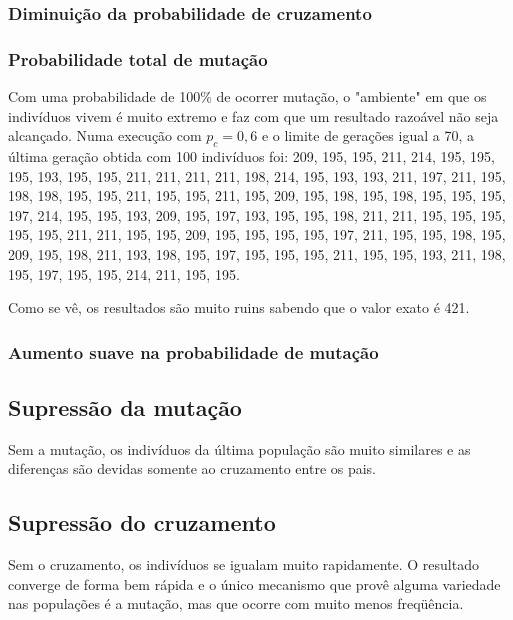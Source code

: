 \documentclass[11pt]{article}
\begin{document}
\subsubsection{Diminuição da probabilidade de cruzamento}

\subsubsection{Probabilidade total de mutação}

Com uma probabilidade de 100\% de ocorrer mutação, o "ambiente" em que os indivíduos vivem é muito extremo e faz com que um resultado razoável não seja alcançado. Numa execução com $p_c = 0,6$ e o limite de gerações igual a 70, a última geração obtida com 100 indivíduos foi: 209, 195, 195, 211, 214, 195, 195, 195, 193, 195, 195, 211, 211, 211, 211, 198, 214, 195, 193, 193, 211, 197, 211, 195, 198, 198, 195, 195, 211, 195, 195, 211, 195, 209, 195, 198, 195, 198, 195, 195, 195, 197, 214, 195, 195, 193, 209, 195, 197, 193, 195, 195, 198, 211, 211, 195, 195, 195, 195, 195, 211, 211, 195, 195, 209, 195, 195, 195, 195, 197, 211, 195, 195, 198, 195, 209, 195, 198, 211, 193, 198, 195, 197, 195, 195, 195, 211, 195, 195, 193, 211, 198, 195, 197, 195, 195, 214, 211, 195, 195.

Como se vê, os resultados são muito ruins sabendo que o valor exato é 421.

\subsubsection{Aumento suave na probabilidade de mutação}

\subsection{Supressão da mutação}

Sem a mutação, os indivíduos da última população são muito similares e as diferenças são devidas somente ao cruzamento entre os pais.

\subsection{Supressão do cruzamento} 

Sem o cruzamento, os indivíduos se igualam muito rapidamente. O resultado converge de forma bem rápida e o único mecanismo que provê alguma variedade nas populações é a mutação, mas que ocorre com muito menos freqüência.
\end{document}
